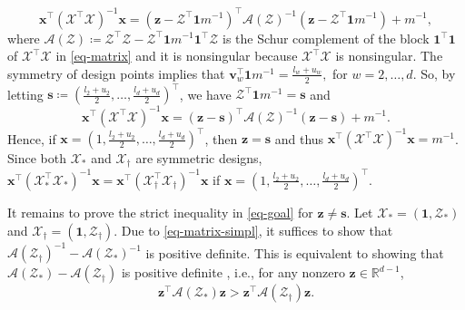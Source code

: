 \documentclass[ijoc,nonblindrev]{informs3}
\def\bx{{\bm x}}
\def\cX{{\mathcal X}}
\def\cZ{{\mathcal Z}}
\def\cA{{\mathcal A}}
\def\bv{{\bm v}}
\def\bz{{\bm z}}
\def\bs{{\bm s}}
\def\bone{{\bm 1}}
\begin{document}
$$
\bx^\intercal (\cX^\intercal \cX)^{-1} \bx = \left( \bz - \cZ^\intercal \bone m^{-1} \right)^\intercal \cA(\cZ)^{-1} \left( \bz - \cZ^\intercal \bone m^{-1} \right) + m^{-1},
$$
where $\cA(\cZ) \coloneqq \cZ^\intercal \cZ - \cZ^\intercal \bone m^{-1} \bone^\intercal \cZ $ is the Schur complement of the block $\bone^\intercal \bone$ of $\cX^\intercal \cX$ in \eqref{eq-matrix} and it is nonsingular because $\cX^\intercal \cX$ is nonsingular.
The symmetry of design points implies that
$
\bv_w^\intercal \bone m^{-1} = \frac{l_w+u_w}{2},
$
for $w=2,\ldots,d$. So, by letting $\bs \coloneqq \left(\frac{l_2+u_2}{2},\ldots,\frac{l_d+u_d}{2} \right)^\intercal$, we have $\cZ^\intercal \bone m^{-1} = \bs$ and
\begin{equation}\label{eq-matrix-simpl}
\bx^\intercal (\cX^\intercal \cX)^{-1} \bx = \left( \bz - \bs \right)^\intercal \cA(\cZ)^{-1} \left( \bz - \bs \right) + m^{-1}.
\end{equation}
Hence, if $\bx = \left(1, \frac{l_2+u_2}{2},\ldots,\frac{l_d+u_d}{2} \right)^\intercal$, then $\bz=\bs$ and thus $\bx^\intercal (\cX^\intercal \cX)^{-1} \bx = m^{-1}$. Since both $\cX_*$ and $\cX_\dag$ are symmetric designs, $\bx^\intercal (\cX_*^\intercal \cX_*)^{-1} \bx = \bx^\intercal (\cX_\dag^\intercal \cX_\dag)^{-1} \bx$ if $\bx = \left(1, \frac{l_2+u_2}{2},\ldots,\frac{l_d+u_d}{2} \right)^\intercal$.

It remains to prove the strict inequality in \eqref{eq-goal} for $\bz \neq \bs$.
Let $\cX_* = (\bone, \cZ_*)$ and $\cX_\dag = (\bone, \cZ_\dag)$.
Due to \eqref{eq-matrix-simpl}, it suffices to show that $\cA(\cZ_{\dag})^{-1} - \cA(\cZ_{*})^{-1}$ is positive definite.
This is equivalent to showing that $\cA(\cZ_{*}) - \cA(\cZ_{\dag})$ is positive definite \cite[Corollary 7.7.4]{horn1990matrix_ec}, i.e., for any nonzero $\bz \in \mathbb{R}^{d-1}$,
\begin{equation}\label{eq-goal-sub}
\bz^\intercal \cA(\cZ_{*})\bz > \bz^\intercal \cA(\cZ_{\dag})\bz.
\end{equation}
\end{document}
